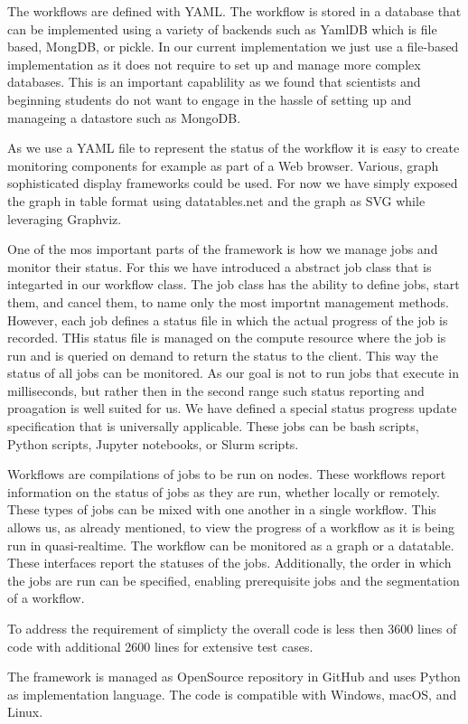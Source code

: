 The workflows are defined with YAML. The workflow is stored in a
database that can be implemented using a variety of backends such as
YamlDB which is file based, MongDB, or pickle. In our current
implementation we just use a file-based implementation as it does not
require to set up and manage more complex databases. This is an
important capablility as we found that scientists and beginning
students do not want to engage in the hassle of setting up and
manageing a datastore such as MongoDB.

As we use a YAML file to represent the status of the workflow it is
easy to create monitoring components for example as part of a Web
browser. Various, graph sophisticated display frameworks could be
used. For now we have simply exposed the graph in table format using
datatables.net and the graph as SVG while leveraging Graphviz.

One of the mos important parts of the framework is how we manage jobs
and monitor their status. For this we have introduced a abstract job
class that is integarted in our workflow class.  The job class has the
ability to define jobs, start them, and cancel them, to name only the
most importnt management methods. However, each job defines a status
file in which the actual progress of the job is recorded. THis status
file is managed on the compute resource where the job is run and is
queried on demand to return the status to the client. This way the
status of all jobs can be monitored.  As our goal is not to run jobs
that execute in milliseconds, but rather then in the second range such
status reporting and proagation is well suited for us.  We have
defined a special status progress update specification that is
universally applicable. These jobs can be bash scripts, Python scripts,
Jupyter notebooks, or Slurm scripts.

Workflows are compilations of jobs to be run on nodes. These workflows
report information on the status of jobs as they are run, whether
locally or remotely.  These types of jobs can be mixed
with one another in a single workflow. This allows us, as already mentioned, 
to view the
progress of a workflow as it is being run in quasi-realtime.
The workflow can
be monitored as a graph or a datatable. These interfaces report the
statuses of the jobs. Additionally, the order in which the jobs are run
can be specified, enabling prerequisite jobs and the segmentation of a
workflow.

To address the requirement of simplicty the overall code is less then
3600 lines of code with additional 2600 lines for extensive test
cases.

The framework is managed as OpenSource repository in GitHub and uses
Python as implementation language. The code is compatible with
Windows, macOS, and Linux.
